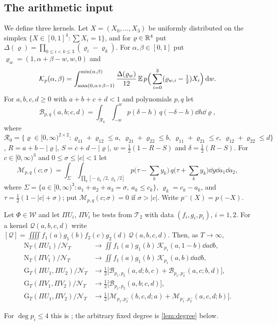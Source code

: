 \documentclass[11pt,colorlinks]{charlie}
\begin{document}
\subsection{The arithmetic input}
We define three kernels. Let $X=(X_0,\dots,X_3)$ be uniformly distributed on the simplex $\{X\in[0,1]^4:\sum X_i=1\}$, and for $\varrho\in\mathbb{R}^4$ put $\Delta(\varrho)=\prod_{0\le i<k\le3}(\varrho_i-\varrho_k)$. For $\alpha,\beta\in[0,1]$ put $\varrho_w=(1,\alpha+\beta-w,w,0)$ and
\begin{equation}\label{eq:Kkernel}
 \mathcal K_p(\alpha,\beta)=\int_{\max(0,\alpha+\beta-1)}^{\min(\alpha,\beta)}\frac{\Delta(\varrho_w)}{12}\,\mathbb{E}\,p\Big(\sum_{i=0}^3(\varrho_{w,i}-\tfrac12)X_i\Big)\,\mathrm{d} w.
\end{equation}
For $a,b,c,d\ge0$ with $a+b+c+d<1$ and polynomials $p,q$ let
\begin{equation}\label{eq:Bkernel}
 \mathcal B_{p,q}(a,b;c,d)=\int_{\mathcal R_0}\int_{-w}^{w}p(\delta-h)\,q(-\delta-h)\dd h\dd\varrho,
\end{equation}
where $\mathcal R_0=\{\varrho\in[0,\infty)^{2\times2}:\varrho_{11}+\varrho_{12}\le a,\ \varrho_{21}+\varrho_{22}\le b,\ \varrho_{11}+\varrho_{21}\le c,\ \varrho_{12}+\varrho_{22}\le d\}$, $R=a+b-|\varrho|$, $S=c+d-|\varrho|$, $w=\frac12(1-R-S)$ and $\delta=\frac12(R-S)$. For $c\in[0,\infty)^3$ and $0\le\sigma\le|c|<1$ let
\begin{equation}\label{eq:Mkernel}
 \mathcal M_{p,q}(c;\sigma)=\int_{\Sigma}\int_{\prod_k[-\varrho_k/2,\varrho_k/2]}p\Big(\tau-\sum_ky_k\Big)\,q\Big(\tau+\sum_ky_k\Big)\dd y\dd a_1\dd a_2,
\end{equation}
where $\Sigma=\{a\in[0,\infty)^3:a_1+a_2+a_3=\sigma,\ a_k\le c_k\}$, $\varrho_k=c_k-a_k$, and $\tau=\frac12(1-|c|+\sigma)$; put $\mathcal M_{p,q}(c;\sigma)=0$ if $\sigma>|c|$. Write $p^-(X)=p(-X)$.

\begin{theorem}[Fraccaro]\label{thm:fraccaro}
Let $\Phi\in\mathcal W$ and let $\Pi U_i$, $\Pi V_i$ be tests from $\mathcal T_2$ with data $(f_i,g_i,p_i)$, $i=1,2$. For a kernel $\mathcal Q(a,b,c,d)$ write $[\mathcal Q]=\iiiint f_1(a)g_1(b)f_2(c)g_2(d)\,\mathcal Q(a,b,c,d)$. Then, as $T\to\infty$,
\begin{align*}
 \mathrm N_T(\Pi U_1)/\mathcal N_T&\to\textstyle\iint f_1(a)g_1(b)\,\mathcal K_{p_1}(a,1-b)\dd a\dd b,\\
 \mathrm N_T(\Pi V_1)/\mathcal N_T&\to\textstyle\iint f_1(a)g_1(b)\,\mathcal K_{p_1}(a,b)\dd a\dd b,\\
 \mathrm G_T(\Pi U_1,\Pi U_2)/\mathcal N_T&\to\tfrac12\big[\mathcal B_{p_1,p_2}(a,d;b,c)+\mathcal B_{p_1,p_2^-}(a,c;b,d)\big],\\
 \mathrm G_T(\Pi V_1,\Pi V_2)/\mathcal N_T&\to\tfrac12\big[\mathcal B_{p_1,p_2}(a,b;c,d)\big],\\
 \mathrm G_T(\Pi U_1,\Pi V_2)/\mathcal N_T&\to\tfrac12\big[\mathcal M_{p_1,p_2^-}(b,c,d;a)+\mathcal M_{p_1^-,p_2^-}(a,c,d;b)\big].
\end{align*}
\end{theorem}
For $\deg p_i\le4$ this is \cite[Props.~3 and 7--10, and (2.65)]{Fraccaro}; the arbitrary fixed degree is \cref{lem:degree} below.
\end{document}
